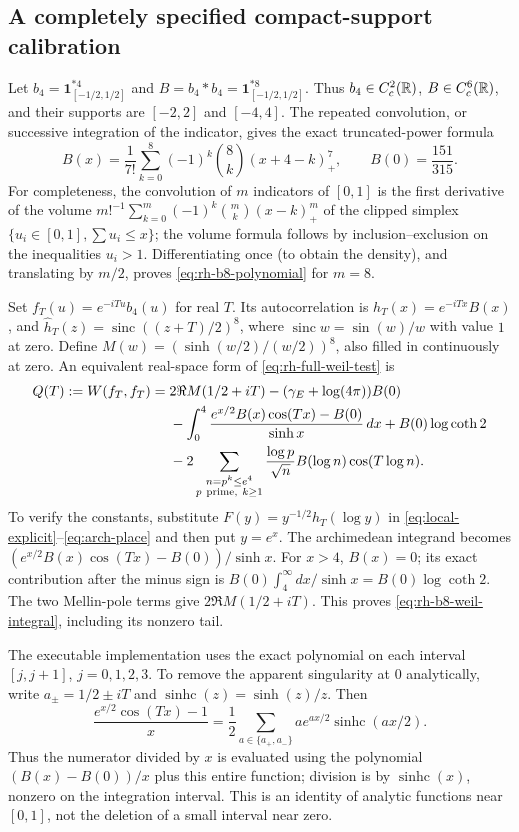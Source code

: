 \subsection{A completely specified compact-support calibration}

Let $b_4=\mathbf1_{[-1/2,1/2]}^{*4}$ and
$B=b_4*b_4=\mathbf1_{[-1/2,1/2]}^{*8}$. Thus $b_4\in C_c^2(\mathbb R)$,
$B\in C_c^6(\mathbb R)$, and their supports are $[-2,2]$ and $[-4,4]$.
The repeated convolution, or successive integration of the indicator,
gives the exact truncated-power formula
\begin{equation}
 B(x)=\frac1{7!}\sum_{k=0}^8(-1)^k\binom8k(x+4-k)_+^7,
 \qquad B(0)=\frac{151}{315}.
 \label{eq:rh-b8-polynomial}
\end{equation}
For completeness, the convolution of $m$ indicators of $[0,1]$ is the
first derivative of the volume
$m!^{-1}\sum_{k=0}^m(-1)^k\binom mk(x-k)_+^m$ of the clipped simplex
$\{u_i\in[0,1],\sum u_i\le x\}$; the volume formula follows by
inclusion--exclusion on the inequalities $u_i>1$.
Differentiating once (to obtain the density), and translating by $m/2$,
proves \eqref{eq:rh-b8-polynomial} for $m=8$.

Set $f_T(u)=e^{-iTu}b_4(u)$ for real $T$. Its autocorrelation is
$h_T(x)=e^{-iTx}B(x)$, and
$\widehat h_T(z)=\operatorname{sinc}((z+T)/2)^8$, where
$\operatorname{sinc}w=\sin(w)/w$ with value $1$ at zero.
Define $M(w)=(\sinh(w/2)/(w/2))^8$, also filled in continuously at zero.
An equivalent real-space form of \eqref{eq:rh-full-weil-test} is
\begin{align}
 Q(T):=W(f_T,f_T)={}&2\Re M(1/2+iT)
       -(\gamma_E+\log(4\pi))B(0)\notag\\
 &-\int_0^4\frac{e^{x/2}B(x)\cos(Tx)-B(0)}{\sinh x}\,dx
       +B(0)\log\coth2\notag\\
 &-2\sum_{\substack{n=p^k\le e^4\\p\ \text{prime},\ k\ge1}}
       \frac{\log p}{\sqrt n}B(\log n)\cos(T\log n).
 \label{eq:rh-b8-weil-integral}
\end{align}
To verify the constants, substitute
$F(y)=y^{-1/2}h_T(\log y)$ in
\eqref{eq:local-explicit}--\eqref{eq:arch-place} and then put $y=e^x$.
The archimedean integrand becomes
$(e^{x/2}B(x)\cos(Tx)-B(0))/\sinh x$.
For $x>4$, $B(x)=0$; its exact contribution after the minus sign is
$B(0)\int_4^\infty dx/\sinh x=B(0)\log\coth2$.
The two Mellin-pole terms give $2\Re M(1/2+iT)$.
This proves \eqref{eq:rh-b8-weil-integral}, including its nonzero tail.

The executable implementation uses the exact polynomial on each interval
$[j,j+1]$, $j=0,1,2,3$. To remove the apparent singularity at $0$ analytically,
write $a_\pm=1/2\pm iT$ and $\operatorname{sinhc}(z)=\sinh(z)/z$.
Then
\[
 \frac{e^{x/2}\cos(Tx)-1}{x}
 =\frac12\sum_{a\in\{a_+,a_-\}}
     a e^{ax/2}\operatorname{sinhc}(ax/2).
\]
Thus the numerator divided by $x$ is evaluated using the polynomial
$(B(x)-B(0))/x$ plus this entire function; division is by
$\operatorname{sinhc}(x)$, nonzero on the integration interval.
This is an identity of analytic functions near $[0,1]$, not the deletion
of a small interval near zero.

